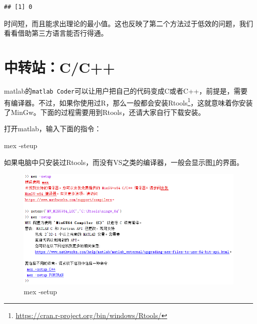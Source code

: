 \documentclass[]{ctexbook}
\newenvironment{Shaded}{\begin{snugshade}}{\end{snugshade}}
\newcommand{\OperatorTok}[1]{\textcolor[rgb]{0.81,0.36,0.00}{\textbf{#1}}}
\newcommand{\NormalTok}[1]{#1}
\renewcommand{\href}[2]{#2\footnote{\url{#1}}}
\theoremstyle{definition}
\theoremstyle{definition}
\theoremstyle{definition}
\theoremstyle{remark}
\begin{document}
\begin{Shaded}
\end{Shaded}

\begin{verbatim}
## [1] 0
\end{verbatim}

时间短，而且能求出理论的最小值。这也反映了第二个方法过于低效的问题，我们看看借助第三方语言能否行得通。

\section{中转站：C/C++}\label{cc}

matlab的\texttt{matlab\ Coder}可以让用户把自己的代码变成C或者C++，前提是，需要有编译器。不过，如果你使用过R，那么一般都会安装\href{https://cran.r-project.org/bin/windows/Rtools/}{Rtools}，这就意味着你安装了MinGw。下面的过程需要用到Rtools，还请大家自行下载安装。

打开matlab，输入下面的指令：

\begin{Shaded}
\begin{Highlighting}[]
\NormalTok{mex -steup}
\end{Highlighting}
\end{Shaded}

如果电脑中只安装过Rtools，而没有VS之类的编译器，一般会显示图\ref{fig:mex}的界面。

\begin{figure}

{\centering \includegraphics[width=0.95\linewidth]{img/mex} 

}

\caption{mex -setup}\label{fig:mex}
\end{figure}
\end{document}
